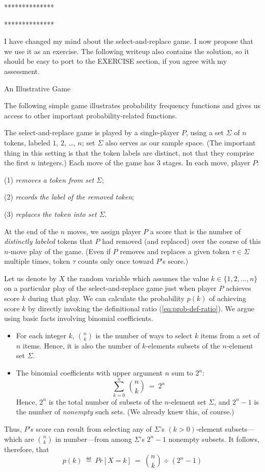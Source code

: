 **************

**************

{\Arny I have changed my mind about the {\sc select-and-replace} game.  I now propose that we use it as an exercise.  The following writeup also contains the solution, so it should be easy to port to the EXERCISE section, if you agree with my assessment.}

{An Illustrative Game}

The following simple game illustrates probability frequency functions and
gives us access to other important probability-related functions.

The {\sc select-and-replace} game is played by a single-player $P$, using a
set $\Sigma$ of $n$ tokens, labeled $1$, $2$, \ldots, $n$; set $\Sigma$
also serves as our sample space. (The important thing in this setting is that 
the token labels are distinct, not that they comprise the first $n$ integers.)
Each move of the game has $3$ stages.  In each move, player $P$:

(1) {\em removes a token from set $\Sigma$};

(2) {\em records the label of the removed token};

(3) {\em replaces the token into set $\Sigma$}.

\noindent
At the end of the $n$ moves, we assign player $P$ a score that is the number of 
{\em distinctly labeled} tokens that $P$ had removed (and replaced) over the
course of this $n$-move play of the game.  (Even if $P$ removes and replaces
a given token $\tau \in \Sigma$ multiple times, token $\tau$ counts only once toward $P$'s score.)

Let us denote by $X$ the random variable which assumes the value 
$k \in \{1, 2, \ldots, n\}$ on a particular play of the {\sc select-and-replace} game 
just when player $P$ achieves score $k$ during that play.  We can calculate the
probability $p(k)$ of achieving score $k$ by directly invoking the
definitional ratio (\ref{eq:prob-def-ratio}).  We argue using basic facts involving 
binomial coefficients.
\begin{itemize}
\item
For each integer $k$, $\displaystyle {n \choose k}$ is the number of ways to 
select $k$ items from a set of $n$ items.
Hence, it is also the number of $k$-elements subsets of the $n$-element 
set $\Sigma$.
\item
The binomial coefficients with upper argument $n$ sum to $2^n$:
\[ \sum_{k=0}^n \ {n \choose k} \ = \ 2^n \]
Hence, $2^n$ is the total number of subsets of the $n$-element set $\Sigma$,
and $2^n -1$ is the number of {\em nonempty} such sets.
(We already knew this, of course.)
\end{itemize}
Thus, $P$'s score can result from selecting any of $\Sigma$'s $(k > 0)$-element 
subsets---which are $\displaystyle {n \choose k}$ in number---from among 
$\Sigma$'s $2^n -1$ nonempty subsets.  It follows, therefore, that
\[ p(k) \ \eqdef \ Pr[X = k] \ = \ {n \choose k} \div (2^n -1)  \]

